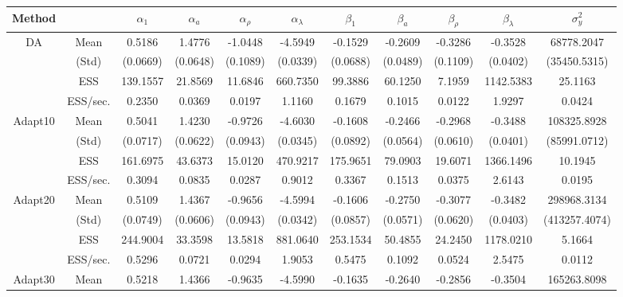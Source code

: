 {\footnotesize 
{ \renewcommand{\arraystretch}{1.2} 
\begin{table} 
\hspace*{-2.5cm} 
\begin{tabular}{cc ccc ccc ccc} 
\hline 
 Method & &  $\alpha_{1}$ &  $\alpha_{a}$ &  $\alpha_{\rho}$ &  $\alpha_{\lambda}$ &  $\beta_{1}$ &  $\beta_{a}$ &  $\beta_{\rho}$ &  $\beta_{\lambda}$ &  $\sigma^{2}_{y}$  \\ \hline  \hline
DA & Mean 
 & 0.5186  & 1.4776  & -1.0448  & -4.5949  & -0.1529  & -0.2609  & -0.3286  & -0.3528  & 68778.2047  \\  [0.75ex] 
 & (Std) 
 & (0.0669)  & (0.0648)  & (0.1089)  & (0.0339)  & (0.0688)  & (0.0489)  & (0.1109)  & (0.0402)  & (35450.5315)  \\  [0.75ex] 
 & ESS 
 & 139.1557  & 21.8569  & 11.6846  & 660.7350  & 99.3886  & 60.1250  & 7.1959  & 1142.5383  & 25.1163  \\  [0.75ex] 
[592.08 s]  & ESS/sec. 
 & 0.2350  & 0.0369  & 0.0197  & 1.1160  & 0.1679  & 0.1015  & 0.0122  & 1.9297  & 0.0424  \\  [1.3ex] 
Adapt10 & Mean 
 & 0.5041  & 1.4230  & -0.9726  & -4.6030  & -0.1608  & -0.2466  & -0.2968  & -0.3488  & 108325.8928  \\  [0.75ex] 
 & (Std) 
 & (0.0717)  & (0.0622)  & (0.0943)  & (0.0345)  & (0.0892)  & (0.0564)  & (0.0610)  & (0.0401)  & (85991.0712)  \\  [0.75ex] 
 & ESS 
 & 161.6975  & 43.6373  & 15.0120  & 470.9217  & 175.9651  & 79.0903  & 19.6071  & 1366.1496  & 10.1945  \\  [0.75ex] 
[522.57 s]  & ESS/sec. 
 & 0.3094  & 0.0835  & 0.0287  & 0.9012  & 0.3367  & 0.1513  & 0.0375  & 2.6143  & 0.0195  \\  [1.3ex] 
Adapt20 & Mean 
 & 0.5109  & 1.4367  & -0.9656  & -4.5994  & -0.1606  & -0.2750  & -0.3077  & -0.3482  & 298968.3134  \\  [0.75ex] 
 & (Std) 
 & (0.0749)  & (0.0606)  & (0.0943)  & (0.0342)  & (0.0857)  & (0.0571)  & (0.0620)  & (0.0403)  & (413257.4074)  \\  [0.75ex] 
 & ESS 
 & 244.9004  & 33.3598  & 13.5818  & 881.0640  & 253.1534  & 50.4855  & 24.2450  & 1178.0210  & 5.1664  \\  [0.75ex] 
[462.42 s]  & ESS/sec. 
 & 0.5296  & 0.0721  & 0.0294  & 1.9053  & 0.5475  & 0.1092  & 0.0524  & 2.5475  & 0.0112  \\  [1.3ex] 
Adapt30 & Mean 
 & 0.5218  & 1.4366  & -0.9635  & -4.5990  & -0.1635  & -0.2640  & -0.2856  & -0.3504  & 165263.8098  \\  [0.75ex] 

\end{tabular}
\end{table}}}
